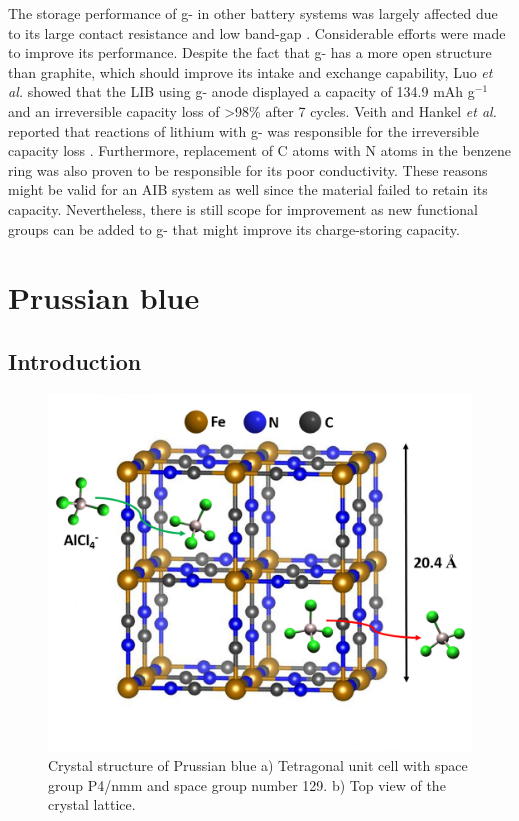 The storage performance of g- in other battery systems was largely affected due to its large contact resistance and low band-gap \cite{shah_highly_2017}. Considerable efforts were made to improve its performance. Despite the fact that g- has a more open structure than graphite, which should improve its  intake and exchange capability, Luo \cite{luo_graphitic_2019} \textit{et al.} showed that the LIB using g- anode displayed a capacity of 134.9 mAh g$^{-1}$ and an irreversible capacity loss of >98\% after 7 cycles. Veith and Hankel \textit{et al.} reported that reactions of lithium with g- was responsible for the irreversible capacity loss \cite{veith_electrochemical_2013, hankel_lithium_2015}. Furthermore, replacement of C atoms with N atoms in the benzene ring was also proven to be responsible for its poor conductivity. These reasons might be valid for an AIB system as well since the material failed to retain its capacity. Nevertheless, there is still scope for improvement as new functional groups can be added to g- that might improve its charge-storing capacity. 

\section{Prussian blue}

\subsection{Introduction}

 \begin{figure}[th!]
  \centering
  \includegraphics[width=\textwidth]{Figures/chap6fig/pbcrys}
    \caption{Crystal structure of Prussian blue a) Tetragonal unit cell with space group P4/nmm and space group number 129. b) Top view of the crystal lattice.}
  \label{Figures/chap6fig:pbcrys}
\end{figure}


